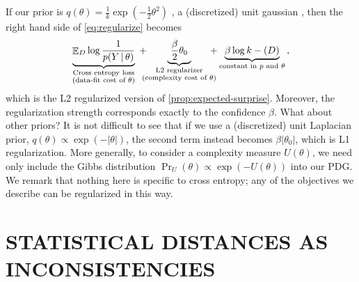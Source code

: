\documentclass[twoside]{article}
\theoremstyle{plain}
\theoremstyle{definition}
\let\H\relax
\DeclareMathOperator{\H}{\mathrm{H}} %
\DeclareMathOperator*{\Ex}{\mathbb{E}} %
\begin{document}
If our prior is $q(\theta) \!=\! \frac{1}{k} \exp(-\frac12 \theta^2)$%
, a (discretized) unit gaussian%
,
then the right hand side
of \eqref{eq:regularize} becomes
\[ \underbrace{\Ex\nolimits_{D}
	\log \frac{1}{p(Y \,|\, \theta)}
	}
	_{\substack{\text{Cross entropy loss}\\(\text{data-fit cost of $\theta$})}}%
	\; + \!\!\!\!\underbrace{~\frac\beta2 \theta_0~}_{\substack{\text{L2  regularizer}\\(\text{complexity cost of $\theta$})}} \!\!\!\!\!
	{\color{black} +
		\underbrace{\beta \log k - \H(D)}_{\text{constant in $p$ and $\theta$}}}\,, \]
which is the L2 regularized version of \cref{prop:expected-surprise}.
Moreover, the regularization strength corresponds exactly to the confidence $\beta$.
What about other priors? It is not difficult to see that if we use a (discretized) unit Laplacian prior, $q(\theta) \propto \exp(-|\theta|)$, the second term instead becomes $\beta |\theta_0|$, which is L1 regularization.
More generally, to consider a complexity measure $U(\theta)$, we need only include the Gibbs distribution $\Pr_U(\theta) \propto \exp(-U(\theta))$ into our PDG.
%
We remark that nothing here is specific to cross entropy;
any of the objectives we describe can be regularized in this way.


\section{STATISTICAL DISTANCES AS INCONSISTENCIES} \label{sec:statdist}
\end{document}
